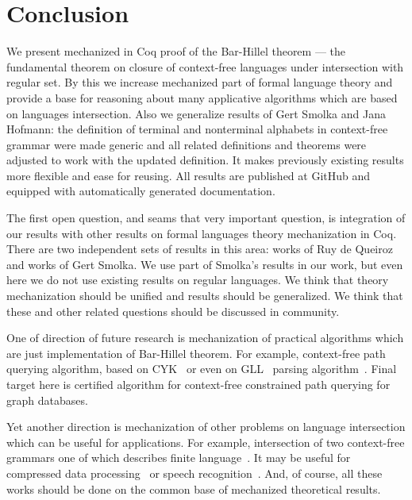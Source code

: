 \section{Conclusion}
\label{sec:conclusion}

We present mechanized in Coq proof of the Bar-Hillel theorem --- the fundamental theorem on closure of context-free languages under intersection with regular set.
By this we increase mechanized part of formal language theory and provide a base for reasoning about many applicative algorithms which are based on languages intersection.
Also we generalize results of Gert Smolka and Jana Hofmann: the definition of terminal and nonterminal alphabets in context-free grammar were made generic and all related definitions and theorems were adjusted to work with the updated definition. 
It makes previously existing results more flexible and ease for reusing.
All results are published at GitHub and equipped with automatically generated documentation.

The first open question, and seams that very important question, is integration of our results with other results on formal languages theory mechanization in Coq. 
There are two independent sets of results in this area: works of Ruy de Queiroz and works of Gert Smolka.
We use part of Smolka's results in our work, but even here we do not use existing results on regular languages.
We think that theory mechanization should be unified and results should be generalized.
We think that these and other related questions should be discussed in community.

One of direction of future research is mechanization of practical algorithms which are just implementation of Bar-Hillel theorem.
For example, context-free path querying algorithm, based on CYK~\cite{hellingsPathQuerying,zhang2016context} or even on GLL~\cite{scott2010gll} parsing algorithm~\cite{grigorev2016context}.
Final target here is certified algorithm for context-free constrained path querying for graph databases.

Yet another direction is mechanization of other problems on language intersection which can be useful for applications.
For example, intersection of two context-free grammars one of which describes finite language~\cite{nederhof2002parsing, nederhof2004language}.
It may be useful for compressed data processing~\cite{Lohrey2012AlgorithmicsOS} or speech recognition~\cite{Nederhof:2002:PNC:1073083.1073104,NEDERHOF2004172}.
And, of course, all these works should be done on the common base of mechanized theoretical results.



